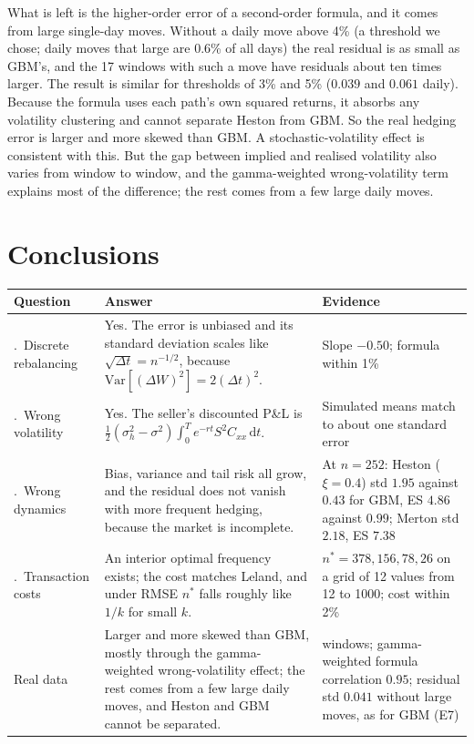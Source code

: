 \documentclass[11pt,a4paper]{article}
\newcommand{\dd}{\,\mathrm{d}}
\begin{document}
What is left is the higher-order error of a second-order formula, and it comes from large single-day moves. Without a daily move above 4\% (a threshold we chose; daily moves that large are 0.6\% of all days) the real residual is as small as GBM's, and the 17 windows with such a move have residuals about ten times larger. The result is similar for thresholds of 3\% and 5\% ($0.039$ and $0.061$ daily). Because the formula uses each path's own squared returns, it absorbs any volatility clustering and cannot separate Heston from GBM. So the real hedging error is larger and more skewed than GBM. A stochastic-volatility effect is consistent with this. But the gap between implied and realised volatility also varies from window to window, and the gamma-weighted wrong-volatility term explains most of the difference; the rest comes from a few large daily moves.

\section{Conclusions}

\begin{center}
\small
\begin{tabularx}{\linewidth}{>{\raggedright\arraybackslash}p{2.4cm} >{\raggedright\arraybackslash}X >{\raggedright\arraybackslash}X}
\toprule
Question & Answer & Evidence \\
\midrule
1.\ Discrete rebalancing &
Yes. The error is unbiased and its standard deviation scales like $\sqrt{\Delta t}=n^{-1/2}$, because $\mathrm{Var}[(\Delta W)^2]=2(\Delta t)^2$. &
Slope $-0.50$; formula within 1\% \\
2.\ Wrong volatility &
Yes. The seller's discounted P\&L is $\tfrac12(\sigma_h^2-\sigma^2)\int_0^T e^{-rt}S^2C_{xx}\dd t$. &
Simulated means match to about one standard error \\
3.\ Wrong dynamics &
Bias, variance and tail risk all grow, and the residual does not vanish with more frequent hedging, because the market is incomplete. &
At $n=252$: Heston ($\xi=0.4$) std $1.95$ against $0.43$ for GBM, ES $4.86$ against $0.99$; Merton std $2.18$, ES $7.38$ \\
4.\ Transaction costs &
An interior optimal frequency exists; the cost matches Leland, and under RMSE $n^*$ falls roughly like $1/k$ for small $k$. &
$n^*=378,156,78,26$ on a grid of 12 values from 12 to 1000; cost within 2\% \\
Real data &
Larger and more skewed than GBM, mostly through the gamma-weighted wrong-volatility effect; the rest comes from a few large daily moves, and Heston and GBM cannot be separated. &
372 windows; gamma-weighted formula correlation $0.95$; residual std $0.041$ without large moves, as for GBM (E7) \\
\bottomrule
\end{tabularx}
\end{center}
\end{document}
